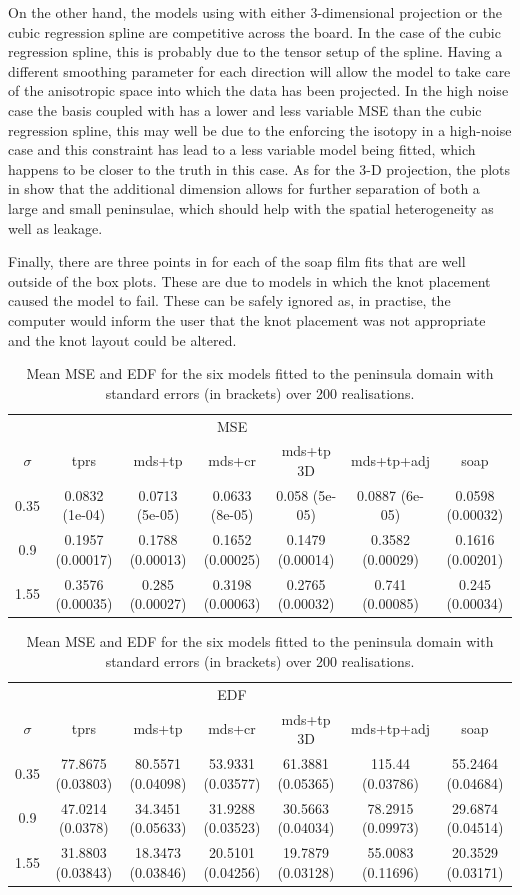 On the other hand, the models using \mdsap with either 3-dimensional projection or the cubic regression spline are competitive across the board. In the case of the cubic regression spline, this is probably due to the tensor setup of the spline. Having a different smoothing parameter for each direction will allow the model to take care of the anisotropic space into which the data has been projected. In the high noise case the \tprs basis coupled with \mdsap has a lower and less variable MSE than the cubic regression spline, this may well be due to the \tprs enforcing the isotopy in a high-noise case and this constraint has lead to a less variable model being fitted, which happens to be closer to the truth in this case. As for the 3-D projection, the plots in  show that the additional dimension allows for further separation of both a large and small peninsulae, which should help with the spatial heterogeneity as well as leakage.

Finally, there are three points in  for each of the soap film fits that are well outside of the box plots. These are due to models in which the knot placement caused the model to fail. These can be safely ignored as, in practise, the computer would inform the user that the knot placement was not appropriate and the knot layout could be altered.

\begin{table}
\centering
\begin{tabular}{c c c c c c c}
 & &  & MSE  & & &\\ 
$\sigma$  & tprs & mds+tp & mds+cr & mds+tp 3D & mds+tp+adj & soap\\ 
\hline
0.35  & 0.0832 (1e-04) & 0.0713 (5e-05) & 0.0633 (8e-05) & 0.058 (5e-05) & 0.0887 (6e-05) & 0.0598 (0.00032)\\ 
0.9  & 0.1957 (0.00017) & 0.1788 (0.00013) & 0.1652 (0.00025) & 0.1479 (0.00014) & 0.3582 (0.00029) & 0.1616 (0.00201)\\ 
1.55  & 0.3576 (0.00035) & 0.285 (0.00027) & 0.3198 (0.00063) & 0.2765 (0.00032) & 0.741 (0.00085) & 0.245 (0.00034)\\ 
\end{tabular}
\begin{tabular}{c c c c c c c}
 & &  & EDF  & & &\\ 
$\sigma$  & tprs & mds+tp & mds+cr & mds+tp 3D & mds+tp+adj & soap\\ 
\hline
0.35  & 77.8675 (0.03803) & 80.5571 (0.04098) & 53.9331 (0.03577) & 61.3881 (0.05365) & 115.44 (0.03786) & 55.2464 (0.04684)\\ 
0.9  & 47.0214 (0.0378) & 34.3451 (0.05633) & 31.9288 (0.03523) & 30.5663 (0.04034) & 78.2915 (0.09973) & 29.6874 (0.04514)\\ 
1.55  & 31.8803 (0.03843) & 18.3473 (0.03846) & 20.5101 (0.04256) & 19.7879 (0.03128) & 55.0083 (0.11696) & 20.3529 (0.03171)\\ 
\end{tabular}
\caption{Mean MSE and EDF for the six models fitted to the peninsula domain with standard errors (in brackets) over 200 realisations.}
\label{bigwt2resultstable}
\end{table}

